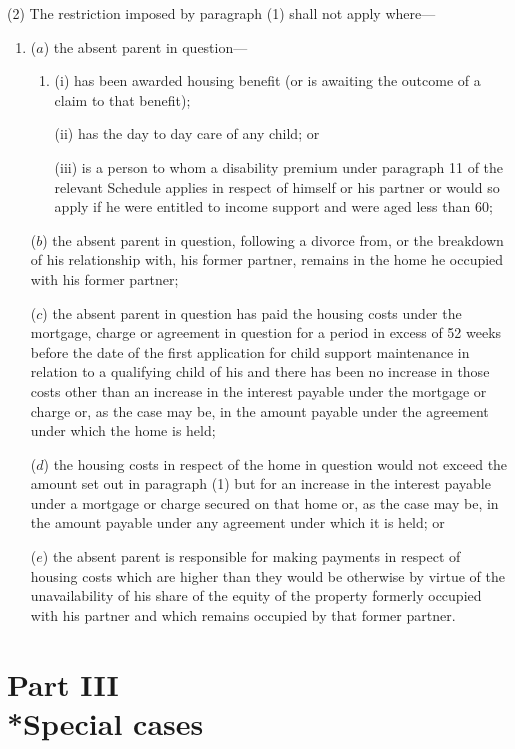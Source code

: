 \documentclass[a4paper]{article}
\begin{document}
(2) The restriction imposed by paragraph (1) shall not apply where—
\begin{enumerate}\item[]
($a$) the absent parent in question—
\begin{enumerate}\item[]
(i) has been awarded housing benefit (or is awaiting the outcome of a claim to that benefit);

(ii) has the day to day care of any child; or

(iii) is a person to whom a disability premium under paragraph 11 of the relevant Schedule applies in respect of himself or his partner or would so apply if he were entitled to income support and were aged less than 60;
\end{enumerate}

($b$) the absent parent in question, following a divorce from, or the breakdown of his relationship with, his former partner, remains in the home he occupied with his former partner;

($c$) the absent parent in question has paid the housing costs under the mortgage, charge or agreement in question for a period in excess of 52 weeks before the date of the first application for child support maintenance in relation to a qualifying child of his and there has been no increase in those costs other than an increase in the interest payable under the mortgage or charge or, as the case may be, in the amount payable under the agreement under which the home is held;

($d$) the housing costs in respect of the home in question would not exceed the amount set out in paragraph (1) but for an increase in the interest payable under a mortgage or charge secured on that home or, as the case may be, in the amount payable under any agreement under which it is held; or

($e$) the absent parent is responsible for making payments in respect of housing costs which are higher than they would be otherwise by virtue of the unavailability of his share of the equity of the property formerly occupied with his partner and which remains occupied by that former partner.
\end{enumerate}

\section[Part III --- Special cases]{Part III\\*Special cases}
\end{document}
